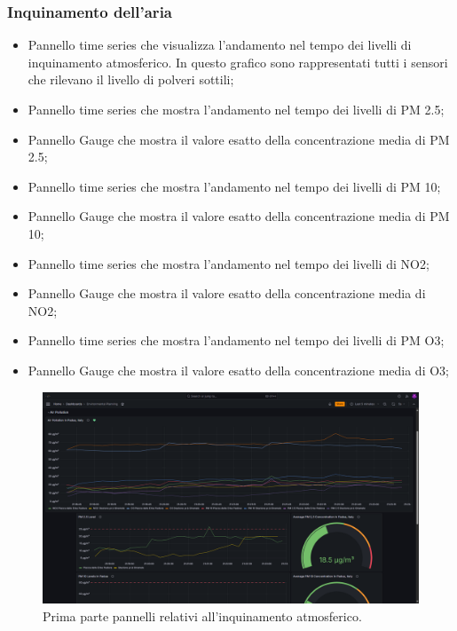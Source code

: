 \documentclass[8pt]{article}
\begin{document}
\subsubsection{Inquinamento dell'aria}
\begin{itemize}
\setlength\itemsep{0em}
    \item Pannello time series che visualizza l'andamento nel tempo dei livelli di inquinamento atmosferico. In questo grafico sono rappresentati tutti i sensori che rilevano il livello di polveri sottili;
    \item Pannello time series che mostra l'andamento nel tempo dei livelli di PM 2.5;
    \item Pannello Gauge che mostra il valore esatto della concentrazione media di PM 2.5;
    \item Pannello time series che mostra l'andamento nel tempo dei livelli di PM 10;
    \item Pannello Gauge che mostra il valore esatto della concentrazione media di PM 10;
    \item Pannello time series che mostra l'andamento nel tempo dei livelli di NO2;
    \item Pannello Gauge che mostra il valore esatto della concentrazione media di NO2;
    \item Pannello time series che mostra l'andamento nel tempo dei livelli di PM O3;
    \item Pannello Gauge che mostra il valore esatto della concentrazione media di O3;
\end{itemize}
\begin{figure}[H]
    \centering
    \includegraphics[width=15cm]{images_mu/air_pollution1.png}
    \caption{Prima parte pannelli relativi all'inquinamento atmosferico.}
    \label{fig:Prima parte pannelli relativi all'inquinamento atmosferico}
\end{figure}
\end{document}
